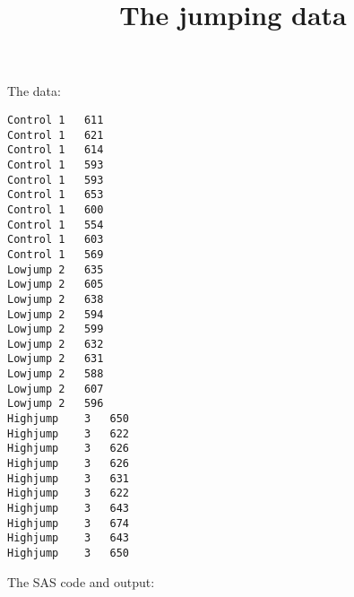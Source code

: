 \documentclass{article}
\title{The jumping data}
\begin{document}
\maketitle
The data:
\begin{verbatim}
Control	1	611
Control	1	621
Control	1	614
Control	1	593
Control	1	593
Control	1	653
Control	1	600
Control	1	554
Control	1	603
Control	1	569
Lowjump	2	635
Lowjump	2	605
Lowjump	2	638
Lowjump	2	594
Lowjump	2	599
Lowjump	2	632
Lowjump	2	631
Lowjump	2	588
Lowjump	2	607
Lowjump	2	596
Highjump	3	650
Highjump	3	622
Highjump	3	626
Highjump	3	626
Highjump	3	631
Highjump	3	622
Highjump	3	643
Highjump	3	674
Highjump	3	643
Highjump	3	650
\end{verbatim}
The SAS code and output:
\end{document}
